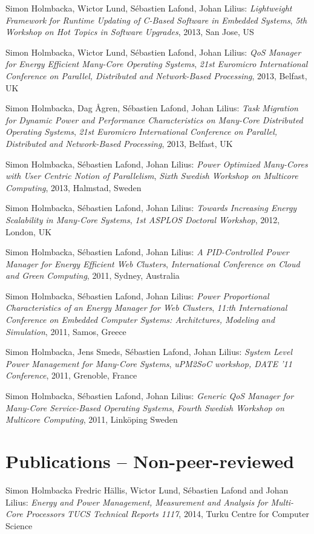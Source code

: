 \documentclass[margin,line]{resume}
\begin{document}
\begin{resume}
Simon Holmbacka, Wictor Lund, S\'{e}bastien Lafond, Johan Lilius: 
\textit{Lightweight Framework for Runtime Updating of C-Based Software in Embedded Systems},
\textsl{5th Workshop on Hot Topics in Software Upgrades}, 2013, San Jose, US

Simon Holmbacka, Wictor Lund, S\'{e}bastien Lafond, Johan Lilius: 
\textit{QoS Manager for Energy Efficient Many-Core Operating Systems},
\textsl{21st Euromicro International Conference on Parallel, Distributed and Network-Based Processing}, 2013, Belfast, UK

Simon Holmbacka, Dag \AA{}gren, S\'{e}bastien Lafond, Johan Lilius: 
\textit{Task Migration for Dynamic Power and Performance Characteristics on Many-Core Distributed Operating Systems},
\textsl{21st Euromicro International Conference on Parallel, Distributed and Network-Based Processing}, 2013, Belfast, UK

Simon Holmbacka, S\'{e}bastien Lafond, Johan Lilius: 
\textit{Power Optimized Many-Cores with User Centric Notion of Parallelism},
\textsl{Sixth Swedish Workshop on Multicore Computing}, 2013, Halmstad, Sweden
  
Simon Holmbacka, S\'{e}bastien Lafond, Johan Lilius: 
\textit{Towards Increasing Energy Scalability in Many-Core Systems}, 
\textsl{1st ASPLOS Doctoral Workshop}, 2012, London, UK

Simon Holmbacka, S\'{e}bastien Lafond, Johan Lilius: 
\textit{A PID-Controlled Power Manager for Energy Efficient Web Clusters}, 
\textsl{International Conference on Cloud and Green Computing}, 2011, Sydney, Australia 

Simon Holmbacka, S\'{e}bastien Lafond, Johan Lilius: 
\textit{Power Proportional Characteristics of an Energy Manager for Web Clusters}, 
\textsl{11:th International Conference on Embedded Computer Systems: Architctures, Modeling and Simulation}, 2011, Samos, Greece

Simon Holmbacka, Jens Smeds, S\'{e}bastien Lafond, Johan Lilius:
\textit{System Level Power Management for Many-Core Systems},
\textsl{uPM2SoC workshop, DATE '11 Conference}, 2011, Grenoble, France

Simon Holmbacka, S\'{e}bastien Lafond, Johan Lilius: 
\textit{Generic QoS Manager for Many-Core Service-Based Operating Systems}, 
\textsl{Fourth Swedish Workshop on Multicore Computing}, 2011, Link\"{o}ping Sweden

\section{\mysidestyle Publications -- Non-peer-reviewed}
Simon Holmbacka Fredric H\"{a}llis, Wictor Lund, S\'{e}bastien Lafond and Johan Lilius:
\textit{Energy and Power Management, Measurement and Analysis for Multi-Core Processors} 
\textsl{TUCS Technical Reports 1117}, 2014, Turku Centre for Computer Science 


\end{resume}
\end{document}
